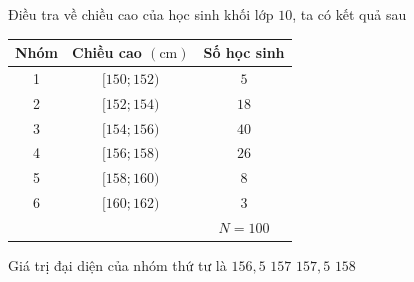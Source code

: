 \begin{ex}%
	Điều tra về chiều cao của học sinh khối lớp $10$,  ta có kết quả sau
	\begin{center}
		\begin{tabular}{|c|c|c|}
			\hline Nhóm & Chiều cao $(\mathrm{cm})$ & Số học  sinh \\
			\hline 1 & {$[150;  152)$} & $5$ \\
			 \hline 2 & {$[152; 154)$} & $18$ \\
			\hline 3 & {$[154; 156)$}  & $40$ \\
			\hline 4 & {$[156; 158)$} & $26$ \\ 
			\hline 5 &  {$[158; 160)$} & $8$ \\
			\hline 6 &  {$[160; 162)$} & $3$ \\
			\hline \multicolumn{2}{|r|}{} &  $N=100$ \\
			\hline 
		\end{tabular}
	\end{center}
	 Giá trị đại diện của nhóm thứ tư là
	 \choice
		 {$156{,}5$}
		{\True $157$} 
		 {$157{,}5$}
		 {$158$}
\end{ex}

